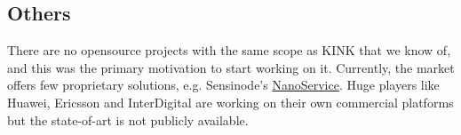 \subsection{Others}
There are no opensource projects with the same scope as KINK that we know of, and this was the primary motivation to start working on it.
Currently, the market offers few proprietary solutions, e.g. Sensinode's \href{http://www.sensinode.com/EN/products/nanoservice.html}{NanoService}.  Huge players like Huawei, Ericsson and InterDigital are working on their own commercial platforms but the state-of-art is not publicly available.
